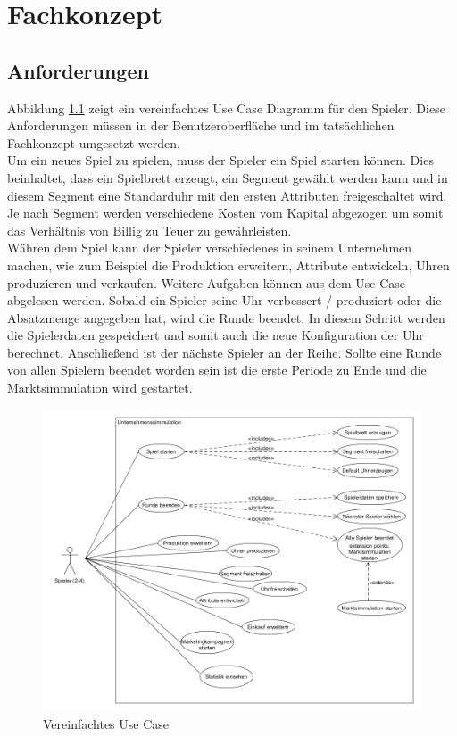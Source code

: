 \chapter{Fachkonzept}
\section{Anforderungen}

Abbildung \ref{fig:abb1} zeigt ein vereinfachtes Use Case Diagramm für den Spieler. Diese Anforderungen müssen in der Benutzeroberfläche und im tatsächlichen Fachkonzept umgesetzt werden. \\
Um ein neues Spiel zu spielen, muss der Spieler ein Spiel starten können. Dies beinhaltet, dass ein Spielbrett erzeugt, ein Segment gewählt werden kann und in diesem Segment eine Standarduhr mit den ersten Attributen freigeschaltet wird. Je nach Segment werden verschiedene Kosten vom Kapital abgezogen um somit das Verhältnis von Billig zu Teuer zu gewährleisten. \\
Währen dem Spiel kann der Spieler verschiedenes in seinem Unternehmen machen, wie zum Beispiel die Produktion erweitern, Attribute entwickeln, Uhren produzieren und verkaufen. Weitere Aufgaben können aus dem Use Case abgelesen werden. Sobald ein Spieler seine Uhr verbessert / produziert oder die Absatzmenge angegeben hat, wird die Runde beendet. In diesem Schritt werden die Spielerdaten gespeichert und somit auch die neue Konfiguration der Uhr berechnet. Anschließend ist der nächste Spieler an der Reihe. Sollte eine Runde von allen Spielern beendet worden sein ist die erste Periode zu Ende und die Marktsimmulation wird gestartet.

\begin{figure}[!h]
	\centering
	\includegraphics[scale=0.4]{img/UseCase.png} 
	\caption{Vereinfachtes Use Case} \label{fig:abb1}
\end{figure}


